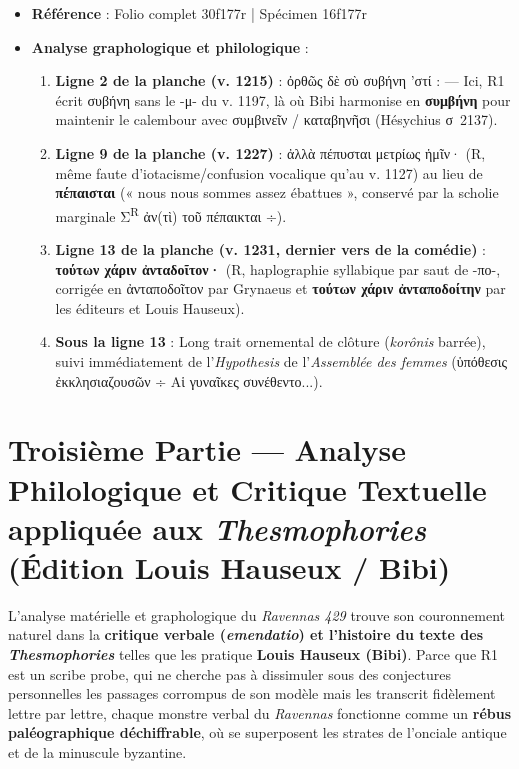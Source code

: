 \documentclass[11pt, a4paper, twoside]{article}
\renewcommand{\_}{\origunderscore\penalty0\relax}
\renewcommand{\texttt}[1]{#1}
\newcommand{\R}{\textbf{R}}
\newcommand{\Run}{\textbf{R}\textsuperscript{1}}
\newcommand{\Bibi}{\textit{Bibi}}
\def\R{R}%
\def\Run{R1}%
\def\Bibi{Bibi}%
\begin{document}
\begin{itemize}[leftmargin=1.5em, itemsep=2pt]
  \item \textbf{Référence} : Folio complet \texttt{30\_f177r} | Spécimen \texttt{16\_f177r}
  \item \textbf{Analyse graphologique et philologique} :
  \begin{enumerate}[leftmargin=1.6em, itemsep=2pt]
  \item \textbf{Ligne 2 de la planche (\texttt{v. 1215})} : \texttt{ὀρθῶς δὲ σὺ συβήνη 'στί :} — Ici, \Run{} écrit \texttt{συβήνη} sans le -μ- du v. 1197, là où \Bibi{} harmonise en \textbf{\texttt{συμβήνη}} pour maintenir le calembour avec συμβινεῖν / καταβηνῆσι (Hésychius σ~2137).
  \item \textbf{Ligne 9 de la planche (\texttt{v. 1227})} : \texttt{ἀλλὰ πέπυσται μετρίως ἡμῖν·} (\R{}, même faute d'iotacisme\slash confusion vocalique qu'au v. 1127) au lieu de \textbf{\texttt{πέπαισται}} (« nous nous sommes assez ébattues », conservé par la scholie marginale Σ\textsuperscript{R} \texttt{ἀν(τὶ) τοῦ πέπαικται ÷}).
  \item \textbf{Ligne 13 de la planche (\texttt{v. 1231}, dernier vers de la comédie)} : \textbf{\texttt{τούτων χάριν ἀνταδοῖτον·}} (\R{}, haplographie syllabique par saut de \texttt{-πο-}, corrigée en \texttt{ἀνταποδοῖτον} par Grynaeus et \textbf{\texttt{τούτων χάριν ἀνταποδοίτην}} par les éditeurs et Louis Hauseux).
  \item \textbf{Sous la ligne 13} : Long trait ornemental de clôture (\textit{korônis} barrée), suivi immédiatement de l'\textit{Hypothesis} de l'\textit{Assemblée des femmes} (\texttt{ὑπόθεσις ἐκκλησιαζουσῶν ÷ Αἱ γυναῖκες συνέθεντο...}).
  \end{enumerate}
\end{itemize}



\newpage
\section{Troisième Partie — Analyse Philologique et Critique Textuelle appliquée aux \textit{Thesmophories} (Édition Louis Hauseux / \Bibi{})}

L'analyse matérielle et graphologique du \textit{Ravennas 429} trouve son couronnement naturel dans la \textbf{critique verbale (\textit{emendatio}) et l'histoire du texte des \textit{Thesmophories}} telles que les pratique \textbf{Louis Hauseux (\Bibi{})}. Parce que \Run{} est un scribe probe, qui ne cherche pas à dissimuler sous des conjectures personnelles les passages corrompus de son modèle mais les transcrit fidèlement lettre par lettre, chaque monstre verbal du \textit{Ravennas} fonctionne comme un \textbf{rébus paléographique déchiffrable}, où se superposent les strates de l'onciale antique et de la minuscule byzantine.
\end{document}
